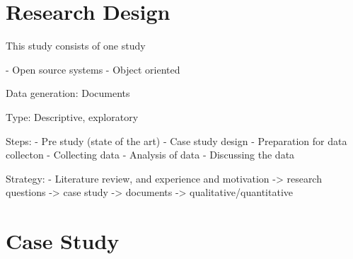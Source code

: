 \section{Research Design}

This study consists of one study

- Open source systems
- Object oriented

Data generation: Documents

Type: Descriptive, exploratory

Steps:
- Pre study (state of the art)
- Case study design
- Preparation for data collecton
- Collecting data
- Analysis of data
- Discussing the data            


Strategy:
- Literature review, and experience and motivation -> research questions -> case study -> documents -> qualitative/quantitative



\section{Case Study}


